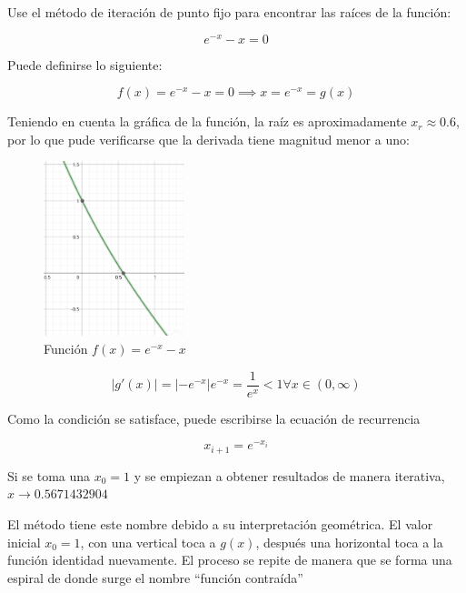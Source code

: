 \begin{ex}
	Use el método de iteración de punto fijo para encontrar las raíces de la
	función:

	\[
		e^{-x} - x = 0
	\]

	\begin{solution}
		Puede definirse lo siguiente:

		\[
			f(x) = e^{-x} - x = 0 \implies x = e^{-x} = g(x)
		\]

		Teniendo en cuenta la gráfica de la función, la raíz es
		aproximadamente $x_r \approx 0.6$, por lo que pude verificarse
		que la derivada tiene magnitud menor a uno:

		\begin{figure}
			\centering
			\includegraphics[height=2in]{img/punto-fijo-img.png}
			\caption{Función $f(x) = e^{-x} - x$}
		\end{figure}

		\[
			|g'(x)| = |-e^{-x}| e^{-x} = \frac{1}{e^x} < 1 \forall x \in (0,
			\infty)
		\]

		Como la condición se satisface, puede escribirse la ecuación de
		recurrencia

		\[
			x_{i+1} = e^{-x_i}
		\]

		Si se toma una $x_0 = 1$ y se empiezan a obtener resultados de
		manera iterativa, $x \rightarrow 0.5671432904$

	\end{solution}
\end{ex}

El método tiene este nombre debido a su interpretación geométrica. El valor
inicial $x_0 = 1$, con una vertical toca a $g(x)$, después una horizontal toca a
la función identidad nuevamente. El proceso se repite de manera que se forma una
espiral de donde surge el nombre ``función contraída''

